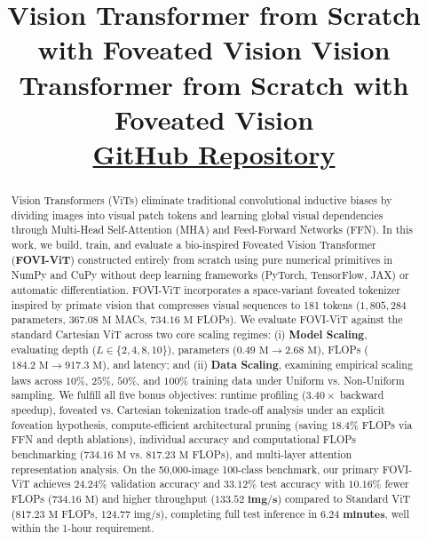 \documentclass[10pt,conference]{IEEEtran}
\begin{document}
\title{Vision Transformer from Scratch with Foveated Vision }

\author{
}

\title{
    Vision Transformer from Scratch with Foveated Vision\\[0.3em]
    \large \href{https://github.com/Deepakmewadaa/GNR-650/tree/main/ViT\%20from\%20scratch}{GitHub Repository}
}


\maketitle

\begin{abstract}
Vision Transformers (ViTs) eliminate traditional convolutional inductive biases by dividing images into visual patch tokens and learning global visual dependencies through Multi-Head Self-Attention (MHA) and Feed-Forward Networks (FFN). In this work, we build, train, and evaluate a bio-inspired Foveated Vision Transformer (\textbf{FOVI-ViT}) constructed entirely from scratch using pure numerical primitives in NumPy and CuPy without deep learning frameworks (PyTorch, TensorFlow, JAX) or automatic differentiation. FOVI-ViT incorporates a space-variant foveated tokenizer inspired by primate vision that compresses visual sequences to 181 tokens ($1,805,284$ parameters, $367.08\text{ M}$ MACs, $734.16\text{ M}$ FLOPs). We evaluate FOVI-ViT against the standard Cartesian ViT across two core scaling regimes: (i) \textbf{Model Scaling}, evaluating depth ($L \in \{2, 4, 8, 10\}$), parameters ($0.49\text{ M} \to 2.68\text{ M}$), FLOPs ($184.2\text{ M} \to 917.3\text{ M}$), and latency; and (ii) \textbf{Data Scaling}, examining empirical scaling laws across $10\%$, $25\%$, $50\%$, and $100\%$ training data under Uniform vs. Non-Uniform sampling. We fulfill all five bonus objectives: runtime profiling ($3.40\times$ backward speedup), foveated vs. Cartesian tokenization trade-off analysis under an explicit foveation hypothesis, compute-efficient architectural pruning (saving $18.4\%$ FLOPs via FFN and depth ablations), individual accuracy and computational FLOPs benchmarking ($734.16\text{ M}$ vs. $817.23\text{ M}$ FLOPs), and multi-layer attention representation analysis. On the 50,000-image 100-class benchmark, our primary FOVI-ViT achieves $\mathbf{24.24\%}$ validation accuracy and $\mathbf{33.12\%}$ test accuracy with $10.16\%$ fewer FLOPs ($734.16\text{ M}$) and higher throughput ($\mathbf{133.52\text{ img/s}}$) compared to Standard ViT ($817.23\text{ M}$ FLOPs, $124.77\text{ img/s}$), completing full test inference in $\mathbf{6.24\text{ minutes}}$, well within the 1-hour requirement.
\end{abstract}
\end{document}
